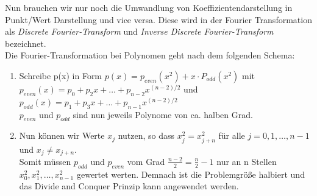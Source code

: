 \documentclass[
../../AuD-Zusammenfassung.tex,
]
{subfiles}
\begin{document}
Nun brauchen wir nur noch die Umwandlung von Koeffizientendarstellung in Punkt/Wert Darstellung und vice versa. Diese wird in der Fourier Transformation als \textit{Discrete Fourier-Transform} und \textit{Inverse Discrete Fourier-Transform} bezeichnet.\\
Die Fourier-Transformation bei Polynomen geht nach dem folgenden Schema:\\
\begin{enumerate}
    \item Schreibe p(x) in Form $p(x) = p_{even}(x^2) + x\cdot P_{odd}(x^2)$ mit $p_{even}(x) = p_0 + p_2x + \ldots + p_{n-2}x^{(n-2)/2}$ und $p_{odd}(x) = p_1 + p_3x + \ldots + p_{n-1}x^{(n-2)/2}$ \\
    $p_{even}$ und $p_{odd}$ sind nun jeweils Polynome von ca. halben Grad.
    \item Nun können wir Werte $x_j$ nutzen, so dass $x_j^2 = x_{j+n}^2$ für alle $j = 0, 1, \ldots, n - 1$ und $x_j \not= x_{j+n}$.\\
    Somit müssen $p_{odd}$ und $p_{even}$ vom Grad $\frac{n-2}{2} = \frac{n}{2} - 1$ nur an n Stellen $x_0^2, x_1^2, \ldots, x_{n-1}^2$ gewertet werten. Demnach ist die Problemgröße halbiert und das Divide and Conquer Prinzip kann angewendet werden.
\end{enumerate}
\end{document}
